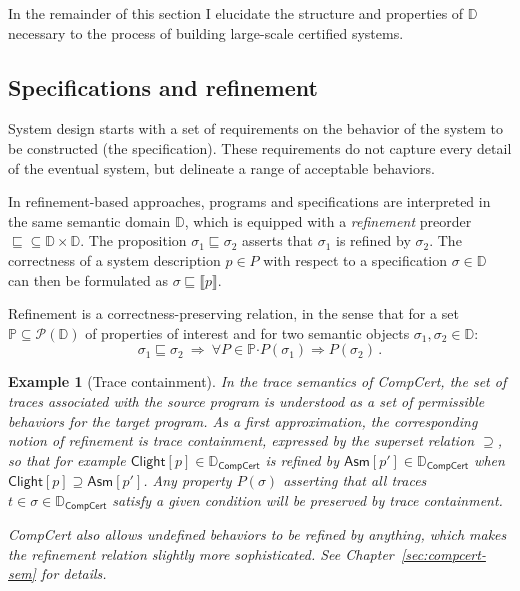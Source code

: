 \documentclass[11pt,oneside,draft]{book}
\newtheorem{example}[theorem]{Example}
\theoremstyle{definition}
\newcommand{\kw}[1]{\ensuremath{ \mathsf{#1} }}
\newcommand{\bdot}{\boldsymbol{\cdot}}
\newcommand{\refby}{\sqsubseteq} %
\begin{document}
In the remainder of this section I elucidate
the structure and properties of $\mathbb{D}$
necessary to the process of building
large-scale certified systems.


\subsection{Specifications and refinement} %

System design starts with a set of requirements
on the behavior of the system to be constructed
(the specification).
These requirements do not capture every detail
of the eventual system,
but delineate a range of acceptable behaviors.

In refinement-based approaches,
programs and specifications are interpreted in the same
semantic domain $\mathbb{D}$,
which is equipped with a \emph{refinement} preorder
${\refby} \subseteq \mathbb{D} \times \mathbb{D}$.
The proposition $\sigma_1 \refby \sigma_2$
asserts that $\sigma_1$ is refined by $\sigma_2$.
The correctness of a system description $p \in P$
with respect to a specification $\sigma \in \mathbb{D}$
can then be formulated as
$\sigma \refby \llbracket p \rrbracket$.

Refinement is a correctness-preserving relation,
in the sense that for a set
$\mathbb{P} \subseteq \mathcal{P}(\mathbb{D})$
of properties of interest
and for two semantic objects $\sigma_1, \sigma_2 \in \mathbb{D}$:
\[
  \sigma_1 \refby \sigma_2 \:\Rightarrow\:
  \forall P \in \mathbb{P} \bdot
    P(\sigma_1) \Rightarrow P(\sigma_2) \,.
\]

\begin{example}[Trace containment]
In the trace semantics of CompCert,
the set of traces associated with the source program
is understood as a set of \emph{permissible} behaviors
for the target program.
As a first approximation,
the corresponding notion of refinement is
\emph{trace containment},
expressed by the superset relation $\supseteq$,
so that for example
$\kw{Clight}[p] \in \mathbb{D}_\kw{CompCert}$
is refined by
$\kw{Asm}[p'] \in \mathbb{D}_\kw{CompCert}$
when
$
  \kw{Clight}[p] \supseteq \kw{Asm}[p']
$.
Any property $P(\sigma)$
asserting that \emph{all} traces
$t \in \sigma \in \mathbb{D}_\kw{CompCert}$
satisfy a given condition
will be preserved by trace containment.

CompCert also allows undefined behaviors
to be refined by anything,
which makes the refinement relation
slightly more sophisticated.
See Chapter~\ref{sec:compcert-sem} for details.
\end{example}
\end{document}
